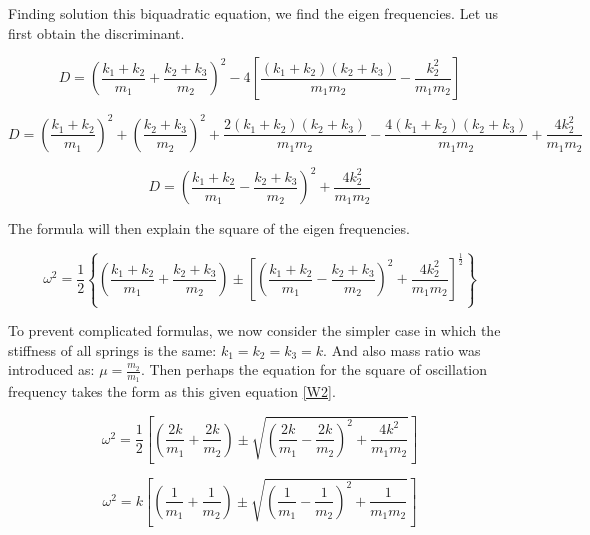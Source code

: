 Finding solution this biquadratic equation, we find the eigen frequencies. Let us first obtain the discriminant. 

\begin{equation}
    D = {\left( {\frac{{{k_1} + {k_2}}}{{{m_1}}} + \frac{{{k_2} + {k_3}}}{{{m_2}}}} \right)^2}
- 4\left[ {\frac{{\left( {{k_1} + {k_2}} \right)\left( {{k_2} + {k_3}} \right)}}{{{m_1}{m_2}}} - \frac{{k_2^2}}{{{m_1}{m_2}}}} \right]
\end{equation}

\begin{equation}
    D ={\left( {\frac{{{k_1} + {k_2}}}{{{m_1}}}} \right)^2} + {\left( {\frac{{{k_2} + {k_3}}}{{{m_2}}}} \right)^2}
+ \frac{{2\left( {{k_1} + {k_2}} \right)\left( {{k_2} + {k_3}} \right)}}{{{m_1}{m_2}}}
- \frac{{4\left( {{k_1} + {k_2}} \right)\left( {{k_2} + {k_3}} \right)}}{{{m_1}{m_2}}}
+ \frac{{4k_2^2}}{{{m_1}{m_2}}}
\end{equation}

\begin{equation}
    D = {\left( {\frac{{{k_1} + {k_2}}}{{{m_1}}} - \frac{{{k_2} + {k_3}}}{{{m_2}}}} \right)^2}
+ \frac{{4k_2^2}}{{{m_1}{m_2}}}
\end{equation}

The formula will then explain the square of the eigen frequencies.

\begin{equation}
    {\omega ^2} = \frac{1}{2}\left\{ {\left( {\frac{{{k_1} + {k_2}}}{{{m_1}}} + \frac{{{k_2} + {k_3}}}{{{m_2}}}} \right) \pm {{\left[ {{{\left( {\frac{{{k_1} + {k_2}}}{{{m_1}}} - \frac{{{k_2} + {k_3}}}{{{m_2}}}} \right)}^2} + \frac{{4k_2^2}}{{{m_1}{m_2}}}} \right]}^{\frac{1}{2}}}} \right\}
\end{equation}

To prevent complicated formulas, we now consider the simpler case in which the stiffness of all springs is the same: ${k_1} = {k_2} ={k_3} = k$. And also mass ratio was introduced as: $\mu  = {\frac{{{m_2}}}{{{m_1}}}}.$ Then perhaps the equation for the square of oscillation frequency takes the form as this given equation \eqref{W2}.

\begin{equation}
    {\omega ^2} = \frac{1}{2}\left[ {\left( {\frac{{2k}}{{{m_1}}} + \frac{{2k}}{{{m_2}}}} \right) \pm \sqrt {{{\left( {\frac{{2k}}{{{m_1}}} - \frac{{2k}}{{{m_2}}}} \right)}^2} + \frac{{4{k^2}}}{{{m_1}{m_2}}}} } \right] 
\end{equation}

\begin{equation}
    \label{W1}
   {\omega ^2} = k\left[ {\left( {\frac{1}{{{m_1}}} + \frac{1}{{{m_2}}}} \right) \pm \sqrt {{{\left( {\frac{1}{{{m_1}}} - \frac{1}{{{m_2}}}} \right)}^2} + \frac{1}{{{m_1}{m_2}}}} } \right] 
\end{equation}

